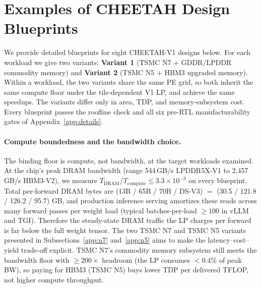 \section{Examples of CHEETAH Design Blueprints}\label{app:blueprints}


We provide detailed blueprints for eight CHEETAH-V1 designs below.  For
each workload we give two variants: \textbf{Variant 1} (TSMC N7 +
GDDR/LPDDR commodity memory) and \textbf{Variant 2} (TSMC N5 + HBM3
upgraded memory).  Within a workload, the two variants share the same PE
grid, so both inherit the same compute floor under the tile-dependent V1
LP, and achieve the same speedups. 
The variants differ only in area, TDP, and memory-subsystem cost.  
Every blueprint passes the roofline check and all six pre-RTL manufacturability gates of Appendix~\ref{app:details}.

\paragraph{Compute boundedness and the bandwidth choice.}
The binding floor is compute, not bandwidth, at the target workloads examined. At the chip's peak DRAM
bandwidth (range 544\,GB/s LPDDR5X-V1 to 2{,}457\,GB/s HBM3-V2), we
measure $T_{\text{DRAM}}/T_{\text{compute}} \le 3.3 \times 10^{-3}$ on
every blueprint.  
Total per-forward DRAM bytes are (13B / 65B / 70B / DS-V3) $=$ (30.5 / 121.8 / 126.2 / 95.7) GB, and production inference serving amortizes these reads across many forward passes per weight load (typical batches-per-load $\ge 100$ in vLLM and TGI). 
Therefore the steady-state DRAM traffic the LP charges per forward is far below the full weight tensor.  
The two TSMC N7 and TSMC N5 variants presented in Subsections~\ref{app:n7} and~\ref{app:n5} aims to make the
latency--cost--yield trade-off explicit. TSMC N7's commodity memory subsystem
still meets the bandwidth floor with $\ge 200\times$ headroom (the LP
consumes $< 0.4\%$ of peak BW), so paying for HBM3 (TSMC N5) buys lower TDP per delivered TFLOP, not higher compute throughput. 



